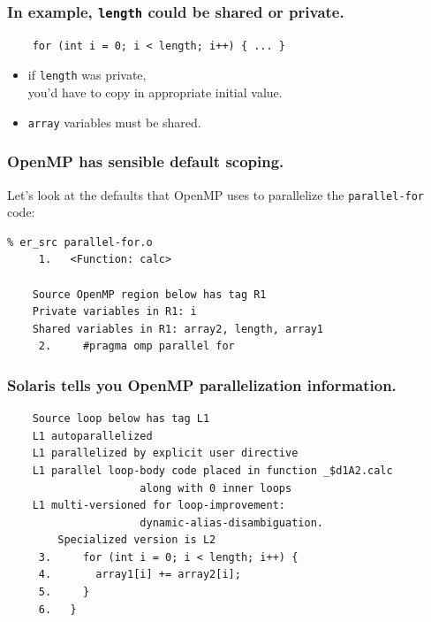 \begin{frame}[fragile]
  \frametitle{In example, {\tt length} could be shared or private.}

  

\begin{verbatim}
    for (int i = 0; i < length; i++) { ... }
\end{verbatim}

\large
\begin{changemargin}{1cm}
  \begin{itemize}
    \item if {\tt length} was private, \\
\hspace*{2em} you'd have to copy
in appropriate initial value.
    \item {\tt array} variables must be shared.
  \end{itemize}
\end{changemargin}

\end{frame}


\begin{frame}[fragile]
  \frametitle{OpenMP has sensible default scoping.}

\begin{changemargin}{2cm}
{\Large Let's look at the defaults that OpenMP uses to parallelize the {\tt parallel-for} code:}
\begin{lstlisting}
% er_src parallel-for.o
     1.   <Function: calc>
    
    Source OpenMP region below has tag R1
    Private variables in R1: i
    Shared variables in R1: array2, length, array1
     2.     #pragma omp parallel for
\end{lstlisting}
\end{changemargin}

\end{frame}


\begin{frame}[fragile]
  \frametitle{Solaris tells you OpenMP parallelization information.}
\begin{changemargin}{2cm}
\begin{lstlisting}
    Source loop below has tag L1
    L1 autoparallelized
    L1 parallelized by explicit user directive
    L1 parallel loop-body code placed in function _$d1A2.calc 
                     along with 0 inner loops
    L1 multi-versioned for loop-improvement:
                     dynamic-alias-disambiguation. 
        Specialized version is L2
     3.     for (int i = 0; i < length; i++) {
     4.       array1[i] += array2[i];
     5.     }
     6.   }
\end{lstlisting}
\end{changemargin}
\end{frame}

